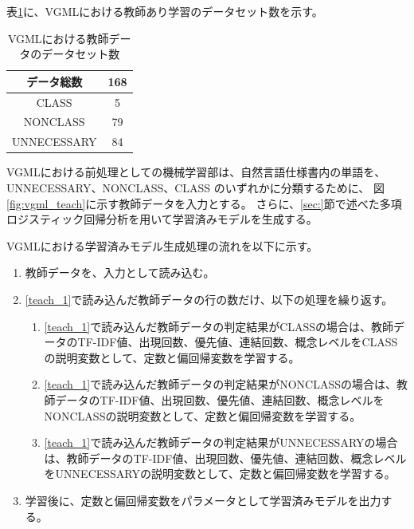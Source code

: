 表\ref{table:vgml_data_set}に、VGMLにおける教師あり学習のデータセット数を示す。

\begin{table}[t]
    \begin{center}
      \caption{VGMLにおける教師データのデータセット数}
      \label{table:vgml_data_set}
      \begin{tabular}{c|c}
        データ総数　& 168\\
        \hline
        \hline
        CLASS    & 5\\ \hline
        NONCLASS & 79\\ \hline
        UNNECESSARY   & 84\\ \hline
      \end{tabular}
    \end{center}
  \end{table}

VGMLにおける前処理としての機械学習部は、自然言語仕様書内の単語を、UNNECESSARY、NONCLASS、CLASS のいずれかに分類するために、
図\ref{fig:vgml_teach}に示す教師データを入力とする。
さらに、\ref{sec:}節で述べた多項ロジスティック回帰分析を用いて学習済みモデルを生成する。

VGMLにおける学習済みモデル生成処理の流れを以下に示す。

\begin{enumerate}
	\item 教師データを、入力として読み込む。
    \label{teach_1}
	\item \ref{teach_1}で読み込んだ教師データの行の数だけ、以下の処理を繰り返す。
        \begin{enumerate}
            \item \ref{teach_1}で読み込んだ教師データの判定結果がCLASSの場合は、教師データのTF-IDF値、出現回数、優先値、連結回数、概念レベルをCLASSの説明変数として、定数と偏回帰変数を学習する。
            \item \ref{teach_1}で読み込んだ教師データの判定結果がNONCLASSの場合は、教師データのTF-IDF値、出現回数、優先値、連結回数、概念レベルをNONCLASSの説明変数として、定数と偏回帰変数を学習する。
            \item \ref{teach_1}で読み込んだ教師データの判定結果がUNNECESSARYの場合は、教師データのTF-IDF値、出現回数、優先値、連結回数、概念レベルをUNNECESSARYの説明変数として、定数と偏回帰変数を学習する。
        \end{enumerate}
	\item 学習後に、定数と偏回帰変数をパラメータとして学習済みモデルを出力する。
\end{enumerate}

